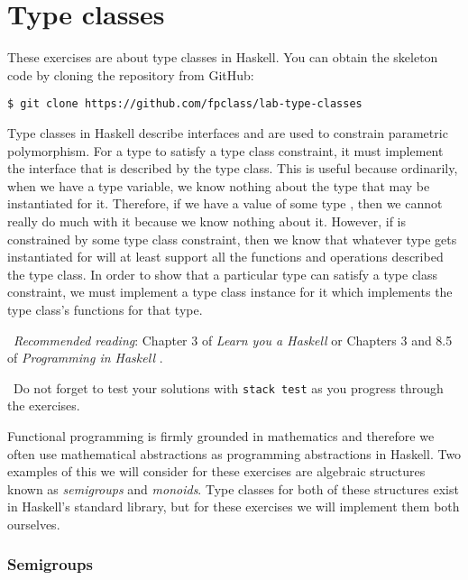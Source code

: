 \section{Type classes}

These exercises are about type classes in Haskell. You can obtain the skeleton code by cloning the repository from GitHub:
\begin{verbatim}
$ git clone https://github.com/fpclass/lab-type-classes
\end{verbatim}

Type classes in Haskell describe interfaces and are used to constrain parametric polymorphism. For a type to satisfy a type class constraint, it must implement the interface that is described by the type class. This is useful because ordinarily, when we have a type variable, we know nothing about the type that may be instantiated for it. Therefore, if we have a value of some type , then we cannot really do much with it because we know nothing about it. However, if  is constrained by some type class constraint, then we know that whatever type gets instantiated for  will at least support all the functions and operations described the type class. In order to show that a particular type can satisfy a type class constraint, we must implement a type class instance for it which implements the type class's functions for that type.

\makebox[0.5cm]{\faBook}~\emph{Recommended reading}: Chapter 3 of \emph{Learn you a Haskell} \citep{lipovaca2011learn} or Chapters 3 and 8.5 of \emph{Programming in Haskell} \citep{hutton2016programming}.

\makebox[0.5cm]{\faLightbulbO}~Do not forget to test your solutions with \texttt{\small stack test} as you progress through the exercises.

\taskLine 

Functional programming is firmly grounded in mathematics and therefore we often use mathematical abstractions as programming abstractions in Haskell. Two examples of this we will consider for these exercises are algebraic structures known as \emph{semigroups} and \emph{monoids}. Type classes for both of these structures exist in Haskell's standard library, but for these exercises we will implement them both ourselves.

\subsubsection{Semigroups}

